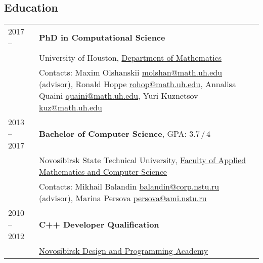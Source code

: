 \documentclass[a4paper,12pt]{article}
\begin{document}
	\subsection*{Education}

	\begin{longtable}{ l >{\raggedright\arraybackslash}p{15cm} }
		2017 --
			& \textbf{PhD in Computational Science} \vspace{1mm}\\
		\phantom{Summer 2018} 
			& University of Houston, \href{http://www.uh.edu/nsm/math/}{Department of Mathematics} \vspace{1mm}\\
			& Contacts: Maxim Olshanskii \href{mailto:molshan@math.uh.edu}{molshan@math.uh.edu} (advisor), Ronald Hoppe \href{m
				ailto:rohop@math.uh.edu}{rohop@math.uh.edu}, 
			Annalisa Quaini \href{mailto:quaini@math.uh.edu}{quaini@math.uh.edu}, Yuri Kuznetsov \href{mailto:kuz@math.uh.edu}{kuz@math.uh.edu} \vspace{3mm}\\
		2013 -- 2017
			& \textbf{Bachelor of Computer Science}, GPA: 3.7\,/\,4 \vspace{1mm}\\
			& Novosibirsk State Technical University, \href{https://en.nstu.ru/education/faculty-of-applied-mathematics-and-computer-science/}{Faculty of Applied Mathematics and Computer Science} \vspace{1mm}\\
			& Contacts: Mikhail Balandin \href{mailto:balandin@corp.nstu.ru}{balandin@corp.nstu.ru} (advisor), Marina Persova \href{mailto:persova@ami.nstu.ru}{persova@ami.nstu.ru} \vspace{3mm}\\
		2010 -- 2012
			& \textbf{C++ Developer Qualification} \vspace{1mm}\\
			& \href{http://www.nadip.ru/}{Novosibirsk Design and Programming Academy}\\
	\end{longtable}
\end{document}
